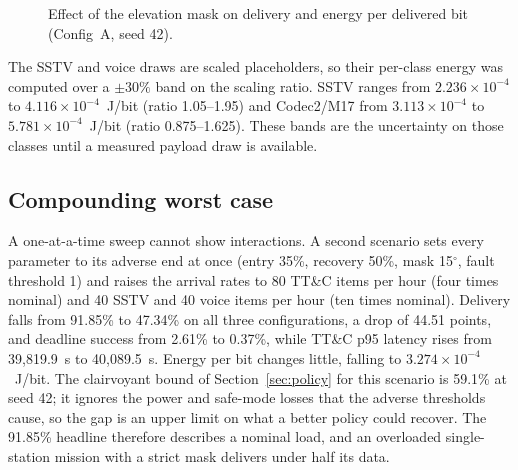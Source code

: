 \documentclass[preprint,12pt]{elsarticle}
\newcommand{\cfgA}{Config~A}
\newcommand{\ttc}{TT\&C}
\begin{document}
\begin{figure}[t]
\centering
{}
\caption{Effect of the elevation mask on delivery and energy per delivered bit (\cfgA{}, seed 42).}
\label{fig:sens}
\end{figure}

The SSTV and voice draws are scaled placeholders, so their per-class energy was computed over a $\pm30\%$ band on the scaling ratio. SSTV ranges from $2.236\times10^{-4}$ to $4.116\times10^{-4}$~J/bit (ratio 1.05--1.95) and Codec2/M17 from $3.113\times10^{-4}$ to $5.781\times10^{-4}$~J/bit (ratio 0.875--1.625). These bands are the uncertainty on those classes until a measured payload draw is available.

\subsection{Compounding worst case}

A one-at-a-time sweep cannot show interactions. A second scenario sets every parameter to its adverse end at once (entry 35\%, recovery 50\%, mask 15$^\circ$, fault threshold 1) and raises the arrival rates to 80 \ttc{} items per hour (four times nominal) and 40 SSTV and 40 voice items per hour (ten times nominal). Delivery falls from 91.85\% to 47.34\% on all three configurations, a drop of 44.51 points, and deadline success from 2.61\% to 0.37\%, while \ttc{} p95 latency rises from 39,819.9~s to 40,089.5~s. Energy per bit changes little, falling to $3.274\times10^{-4}$~J/bit. The clairvoyant bound of Section~\ref{sec:policy} for this scenario is 59.1\% at seed 42; it ignores the power and safe-mode losses that the adverse thresholds cause, so the gap is an upper limit on what a better policy could recover. The 91.85\% headline therefore describes a nominal load, and an overloaded single-station mission with a strict mask delivers under half its data.
\end{document}
